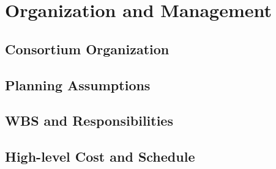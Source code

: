 \section{Organization and Management}
\label{sec:dp-tpcelec-org}

\subsection{Consortium Organization}
\label{ssec:dp-tpcelec-org-consortium}

\subsection{Planning Assumptions}
\label{ssec:dp-tpcelec-org-assmp}

\subsection{WBS and Responsibilities}
\label{ssec:dp-tpcelec-org-wbs}

\subsection{High-level Cost and Schedule}
\label{ssec:dp-tpcelec-org-cs}
